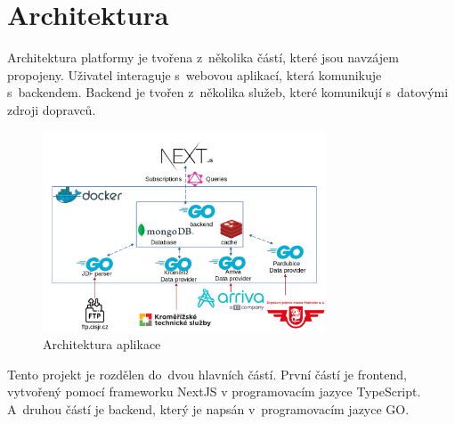 \section{Architektura}
Architektura platformy je tvořena z~několika částí, které jsou navzájem propojeny. Uživatel interaguje s~webovou aplikací, která komunikuje s~backendem. Backend je tvořen z~několika služeb, které komunikují s~datovými zdroji dopravců.
\begin{figure}[H]
    \centering
    \includegraphics[width=0.75\textwidth]{images/architekturaV5.png}
    \caption{Architektura aplikace}
    \label{architektura}
\end{figure}
\newpage
Tento projekt je rozdělen do~dvou hlavních částí. První částí je frontend, vytvořený pomocí frameworku NextJS v programovacím jazyce TypeScript.
A~druhou částí je backend, který je napsán v~programovacím jazyce GO.
